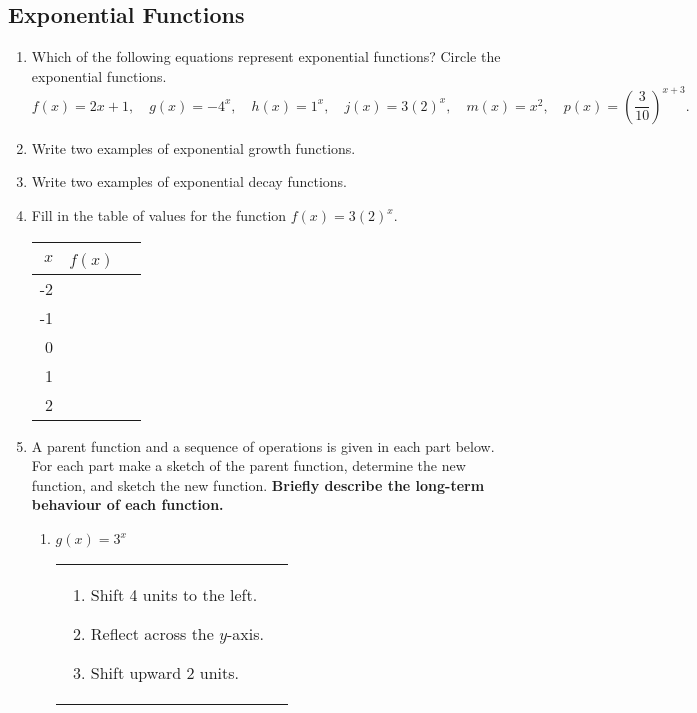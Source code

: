 \subsection{Exponential Functions}
\begin{enumerate}
\item Which of the following equations represent exponential
  functions?
  {Circle the exponential functions.}
  $$f(x)=2x+1, \quad
  g(x)=-4^x, \quad
  h(x)=1^x, \quad
  j(x)=3(2)^x,  \quad
  m(x)=x^2,  \quad
  p(x)=\left(\frac{3}{10}\right)^{x+3}.$$

\item Write two examples of exponential growth functions.
\vfill

\item Write two examples of exponential decay functions.
\vfill

\item Fill in the table of values for the function $f(x)=3(2)^x$.

\begin{center}
\begin{tabular}{|r|l|}
\hline
\textbf{$x$} & \textbf{$f(x)$~~} \\ \hline
-2           &                 \\ [0.5em] \hline
-1           &                 \\ [0.5em] \hline
0            &                 \\ [0.5em] \hline
1            &                 \\ [0.5em] \hline
2            &                 \\ [0.5em] \hline
\end{tabular}
\end{center}

\clearpage

\item A parent function and a sequence of operations is given in each
  part below. For each part make a sketch of the parent function,
  determine the new function, and sketch the new function. \textbf{Briefly
  describe the long-term behaviour of each function.}

  \begin{enumerate}
      \item $g(x)=3^x$ 

        \begin{tabular}{ll} %
          \begin{minipage}[t]{0.5\linewidth}
            \begin{enumerate}
            \item Shift 4 units to the left.
            \item Reflect across the $y$-axis.
            \item Shift upward 2 units.
            \end{enumerate}
          \end{minipage}


\end{tabular}
\end{enumerate}
\end{enumerate}
